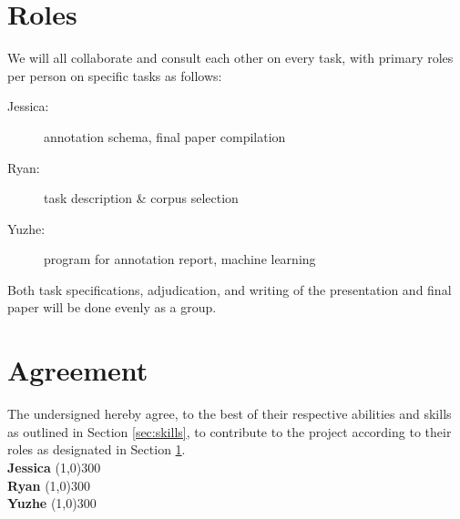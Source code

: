 \documentclass{article}
\newcommand{\groupmember}[1]{#1}
\newcommand{\role}[1]{#1}
\newcommand{\sigline}[2]{\vspace{2em} #1 \hfill \line(1,0){#2}}
\begin{document}
\section{Roles} %
\label{sec:roles}
We will all collaborate and consult each other on every task, with primary roles per person on specific tasks as follows:
\begin{description}
    \item[\role{Jessica}:] annotation schema, final paper compilation
    \item[\role{Ryan}:] task description \& corpus selection
    \item[\role{Yuzhe}:] program for annotation report, machine learning
\end{description}

Both task specifications, adjudication, and writing of the presentation and final paper will be done evenly as a group.

\pagebreak
\section{Agreement} %
\label{par:agreement}
The undersigned hereby agree, to the best of their respective abilities and skills as outlined in Section \ref{sec:skills}, to contribute to the project according to their roles as designated in Section \ref{sec:roles}.%
\vspace{2em}\\
\sigline{\textbf{\groupmember{Jessica}}}{300}\\
\sigline{\textbf{\groupmember{Ryan}}}{300}\\
\sigline{\textbf{\groupmember{Yuzhe}}}{300}\\
\end{document}
